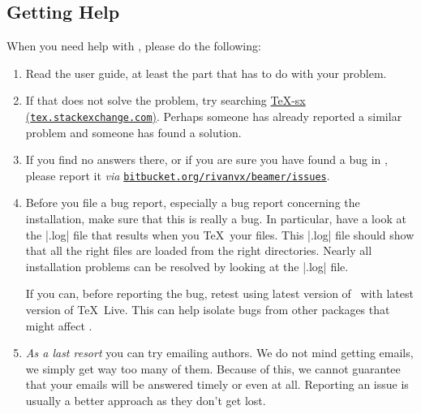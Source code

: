 \subsection{Getting Help}

When you need help with \beamer, please do the following:
\begin{enumerate}
\item
  Read the user guide, at least the part that has to do with your problem.
\item
  If that does not solve the problem, try searching \href{http://tex.stackexchange.com}{TeX-sx (\texttt{tex.stackexchange.com})}.
  Perhaps someone has already reported a similar problem and someone has found a solution.
\item
  If you find no answers there, or if you are sure you have found a bug in
  \beamer{}, please report it \emph{via} \href{https://bitbucket.org/rivanvx/beamer/issues}{\texttt{bitbucket.org/rivanvx/beamer/issues}}.
\item
  Before you file a bug report, especially a bug report concerning the installation, make sure that this is really a bug. In particular, have a look at the |.log| file that results when you \TeX\ your files. This |.log| file should show that all the right files are loaded from the right directories. Nearly all installation problems can be resolved by looking at the |.log| file.

  If you can, before reporting the bug, retest using latest version of \beamer\ with latest version of \TeX\ Live. This can help isolate bugs from other packages that might affect \beamer.
\item
  \emph{As a last resort} you can try emailing authors. We do not mind getting emails, we simply get way too many of them. Because of this, we cannot guarantee that your emails will be answered timely or even at all. Reporting
an issue is usually a better approach as they don't get lost.
\end{enumerate}
